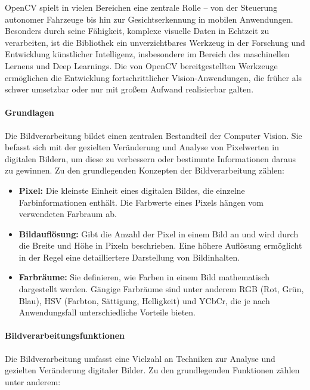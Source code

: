 OpenCV spielt in vielen Bereichen eine zentrale Rolle – von der Steuerung autonomer Fahrzeuge bis hin zur Gesichtserkennung in mobilen Anwendungen. Besonders durch seine Fähigkeit, komplexe visuelle Daten in Echtzeit zu verarbeiten, ist die Bibliothek ein unverzichtbares Werkzeug in der Forschung und Entwicklung künstlicher Intelligenz, insbesondere im Bereich des maschinellen Lernens und Deep Learnings. Die von OpenCV bereitgestellten Werkzeuge ermöglichen die Entwicklung fortschrittlicher Vision-Anwendungen, die früher als schwer umsetzbar oder nur mit großem Aufwand realisierbar galten.

\paragraph{Grundlagen}
Die Bildverarbeitung bildet einen zentralen Bestandteil der Computer Vision. Sie befasst sich mit der gezielten Veränderung und Analyse von Pixelwerten in digitalen Bildern, um diese zu verbessern oder bestimmte Informationen daraus zu gewinnen. Zu den grundlegenden Konzepten der Bildverarbeitung zählen:

\begin{itemize}
    \item \textbf{Pixel:} Die kleinste Einheit eines digitalen Bildes, die einzelne Farbinformationen enthält. Die Farbwerte eines Pixels hängen vom verwendeten Farbraum ab.
    \item \textbf{Bildauflösung:} Gibt die Anzahl der Pixel in einem Bild an und wird durch die Breite und Höhe in Pixeln beschrieben. Eine höhere Auflösung ermöglicht in der Regel eine detailliertere Darstellung von Bildinhalten.
    \item \textbf{Farbräume:} Sie definieren, wie Farben in einem Bild mathematisch dargestellt werden. Gängige Farbräume sind unter anderem RGB (Rot, Grün, Blau), HSV (Farbton, Sättigung, Helligkeit) und YCbCr, die je nach Anwendungsfall unterschiedliche Vorteile bieten.
\end{itemize}

\paragraph{Bildverarbeitungsfunktionen}
Die Bildverarbeitung umfasst eine Vielzahl an Techniken zur Analyse und gezielten Veränderung digitaler Bilder. Zu den grundlegenden Funktionen zählen unter anderem:

